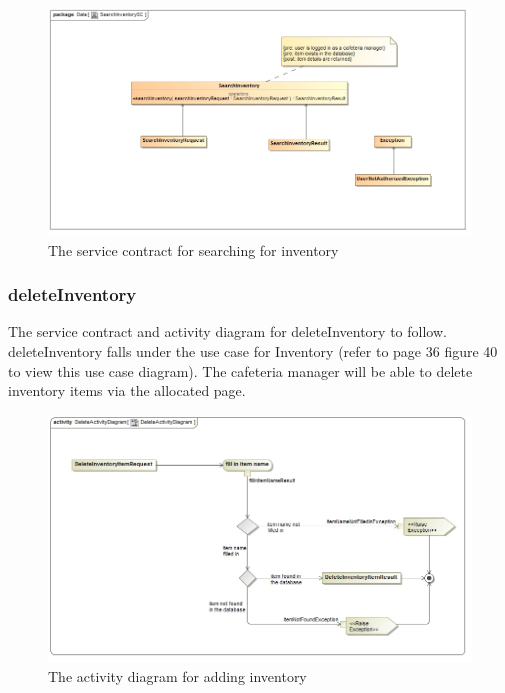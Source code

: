 \documentclass[a4paper,12pt]{report}
\begin{document}
\begin{figure}[H]
	\centering
	\includegraphics[width=1.0\textwidth]{../images/SearchInventorySC.jpg}
	\caption{The service contract for searching for inventory}
\end{figure}

\subsubsection{deleteInventory}
The service contract and activity diagram for deleteInventory to follow. deleteInventory falls under the use case for Inventory (refer to page 36 figure 40 to view this use case diagram). The cafeteria manager will be able to delete inventory items via the allocated page.
\begin{figure}[H]
  \centering
    \includegraphics[width=1.0\textwidth]{../images/DeleteActivityDiagram.jpg}
    \caption{The activity diagram for adding inventory} 
\end{figure}
\end{document}
